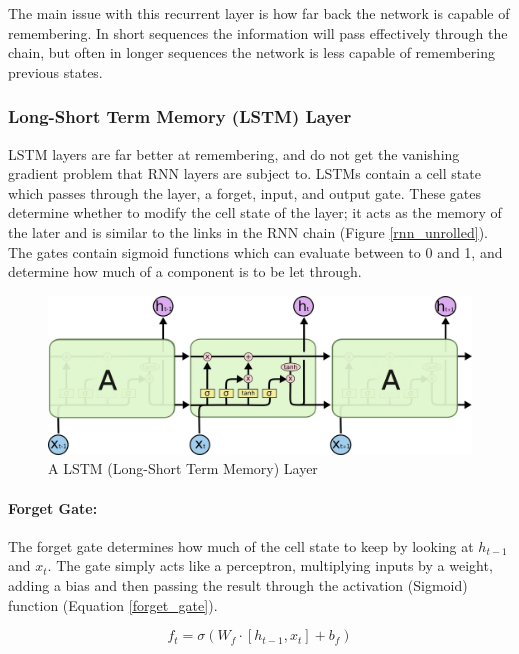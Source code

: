 \documentclass[11pt,twoside]{report}
\begin{document}
The main issue with this recurrent layer is how far back the network is capable of remembering. In short sequences the information will pass effectively through the chain, but often in longer sequences the network is less capable of remembering previous states. 

\subsubsection{Long-Short Term Memory (LSTM) Layer} 
LSTM layers are far better at remembering, and do not get the vanishing gradient problem that RNN layers are subject to. LSTMs contain a cell state which passes through the layer, a forget, input, and output gate. These gates determine whether to modify the cell state of the layer; it acts as the memory of the later and is similar to the links in the RNN chain (Figure \ref{rnn_unrolled}). The gates contain sigmoid functions which can evaluate between to 0 and 1, and determine how much of a component is to be let through.

\noindent \begin{figure}[h!]
	\includegraphics[width = 1.0\hsize]{./figures/LSTM3-chain.png}
	\caption{A LSTM (Long-Short Term Memory) Layer \cite{Christopher_Olah_Blog}}
	\label{lstm_fig}
\end{figure}


\paragraph{Forget Gate:}
The forget gate determines how much of the cell state to keep by looking at $h_{t-1}$ and $x_{t}$. The gate simply acts like a perceptron, multiplying inputs by a weight, adding a bias and then passing the result through the activation (Sigmoid) function (Equation \ref{forget_gate}). 

\begin{equation}
\label{forget_gate}
f_{t} = \sigma (W_{f} \cdot [h_{t-1},x_{t}] + b_{f})
\end{equation}
\end{document}
